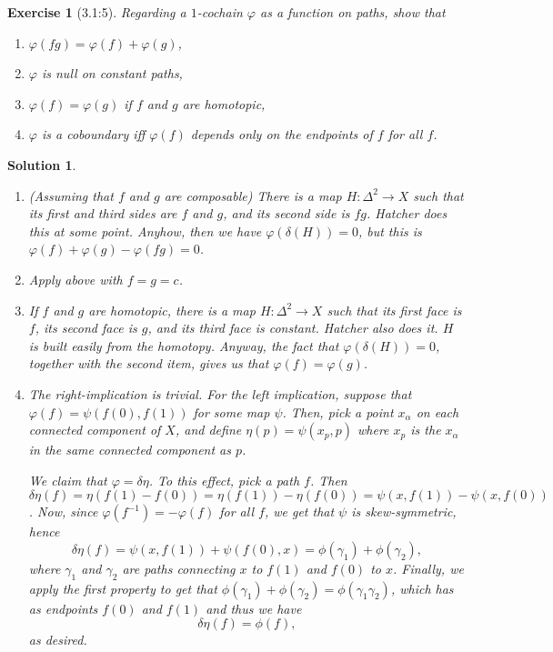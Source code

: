\documentclass{article}
\theoremstyle{plain}
\newtheorem*{ex}{Exercise}
\theoremstyle{nonumberplain}
\newtheorem{sol}{Solution}
\begin{document}
\begin{ex}[3.1:5]
Regarding a $1$-cochain $\varphi$ as a function on paths, show that
\begin{enumerate}
\item $\varphi(fg) = \varphi(f) + \varphi(g)$,
\item $\varphi$ is null on constant paths,
\item $\varphi(f) = \varphi(g)$ if $f$ and $g$ are homotopic,
\item $\varphi$ is a coboundary iff $\varphi(f)$ depends only on the endpoints of $f$ for all $f$.
\end{enumerate}
\end{ex}

\begin{sol}
\leavevmode
\begin{enumerate}
\item (Assuming that $f$ and $g$ are composable) There is a map $H \colon \Delta^2 \to X$ such that its first and third sides are $f$ and $g$, and its second side is $fg$. Hatcher does this at some point. Anyhow, then we have $\varphi(\delta(H)) = 0$, but this is $\varphi(f) + \varphi(g) - \varphi(fg) = 0$.

\item Apply above with $f = g = c$.

\item If $f$ and $g$ are homotopic, there is a map $H \colon \Delta^2 \to X$ such that its first face is $f$, its second face is $g$, and its third face is constant. Hatcher also does it. $H$ is built easily from the homotopy. Anyway, the fact that $\varphi(\delta(H)) = 0$, together with the second item, gives us that $\varphi(f) = \varphi(g)$.

\item The right-implication is trivial. For the left implication, suppose that $\varphi(f) = \psi(f(0), f(1))$ for some map $\psi$. Then, pick a point $x_\alpha$ on each connected component of $X$, and define $\eta(p) = \psi(x_p,p)$ where $x_p$ is the $x_\alpha$ in the same connected component as $p$.

We claim that $\varphi = \delta \eta$. To this effect, pick a path $f$. Then $\delta \eta(f) = \eta(f(1) - f(0)) = \eta(f(1)) - \eta(f(0)) = \psi(x, f(1)) - \psi(x,f(0))$. Now, since $\varphi(f^{-1}) = - \varphi(f)$ for all $f$, we get that $\psi$ is skew-symmetric, hence
\begin{equation}
\delta \eta(f) = \psi(x,f(1)) + \psi(f(0), x) = \phi(\gamma_1) + \phi(\gamma_2),
\end{equation}
where $\gamma_1$ and $\gamma_2$ are paths connecting $x$ to $f(1)$ and $f(0)$ to $x$. Finally, we apply the first property to get that $\phi(\gamma_1) + \phi(\gamma_2) = \phi(\gamma_1 \gamma_2)$, which has as endpoints $f(0)$ and $f(1)$ and thus we have
\begin{equation}
\delta \eta(f) = \phi(f),
\end{equation}
as desired.
\end{enumerate}
\end{sol}
\end{document}

